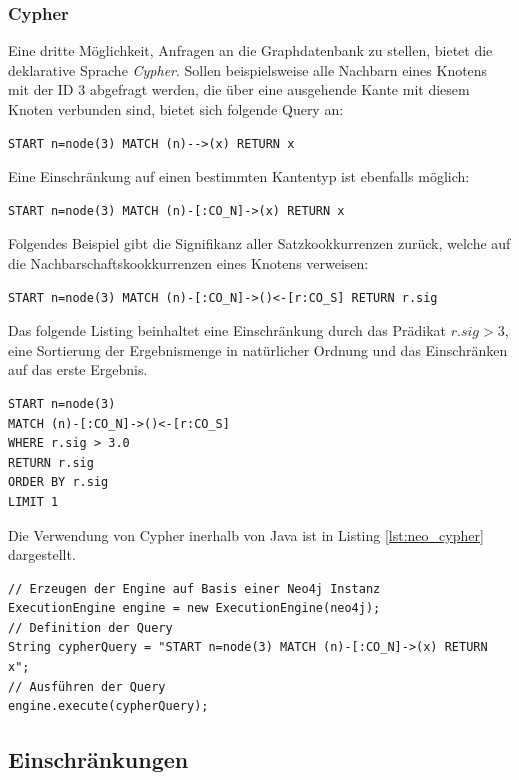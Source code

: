 \documentclass[11pt, a4paper, oneside]{article} %
\begin{document}
\subsubsection{Cypher}

Eine dritte Möglichkeit, Anfragen an die Graphdatenbank zu stellen, bietet die deklarative Sprache \textit{Cypher}. Sollen beispielsweise alle Nachbarn eines Knotens mit der ID 3  abgefragt werden, die über eine ausgehende Kante mit diesem Knoten verbunden sind, bietet sich folgende Query an:
\begin{lstlisting}
START n=node(3) MATCH (n)-->(x) RETURN x
\end{lstlisting}
Eine Einschränkung auf einen bestimmten Kantentyp ist ebenfalls möglich:
\begin{lstlisting}
START n=node(3) MATCH (n)-[:CO_N]->(x) RETURN x
\end{lstlisting}
Folgendes Beispiel gibt die Signifikanz aller Satzkookkurrenzen zurück, welche auf die Nachbarschaftskookkurrenzen eines Knotens verweisen:
\begin{lstlisting}
START n=node(3) MATCH (n)-[:CO_N]->()<-[r:CO_S] RETURN r.sig
\end{lstlisting}
Das folgende Listing beinhaltet eine Einschränkung durch das Prädikat $r.sig > 3$, eine Sortierung der Ergebnismenge in natürlicher Ordnung und das Einschränken auf das erste Ergebnis.
\begin{lstlisting}
START n=node(3) 
MATCH (n)-[:CO_N]->()<-[r:CO_S] 
WHERE r.sig > 3.0 
RETURN r.sig
ORDER BY r.sig
LIMIT 1
\end{lstlisting}

Die Verwendung von Cypher inerhalb von Java ist in Listing \ref{lst:neo_cypher} dargestellt.

\begin{lstlisting}[caption={Verwendung von Cypher in Java},label={lst:neo_cypher}]
// Erzeugen der Engine auf Basis einer Neo4j Instanz
ExecutionEngine engine = new ExecutionEngine(neo4j);
// Definition der Query
String cypherQuery = "START n=node(3) MATCH (n)-[:CO_N]->(x) RETURN x";
// Ausführen der Query
engine.execute(cypherQuery);
\end{lstlisting}

\subsection{Einschränkungen}
\end{document}
